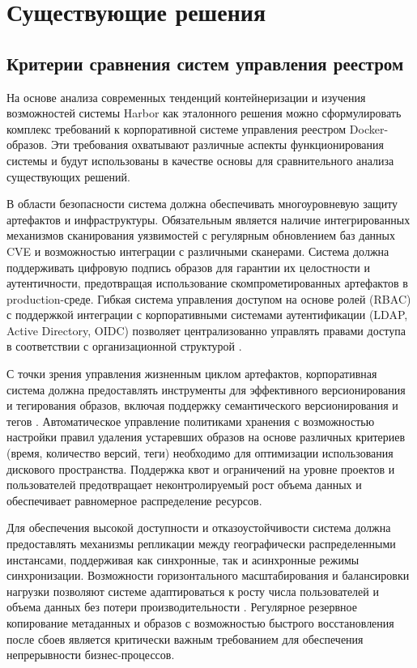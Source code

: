 \chapter{Существующие решения}
\section{Критерии сравнения систем управления реестром}

На основе анализа современных тенденций контейнеризации и изучения возможностей системы Harbor как эталонного решения можно сформулировать комплекс требований к корпоративной системе управления реестром Docker-образов. Эти требования охватывают различные аспекты функционирования системы и будут использованы в качестве основы для сравнительного анализа существующих решений.

В области безопасности система должна обеспечивать многоуровневую защиту артефактов и инфраструктуры. Обязательным является наличие интегрированных механизмов сканирования уязвимостей с регулярным обновлением баз данных CVE и возможностью интеграции с различными сканерами. Система должна поддерживать цифровую подпись образов для гарантии их целостности и аутентичности, предотвращая использование скомпрометированных артефактов в production-среде. Гибкая система управления доступом на основе ролей (RBAC) с поддержкой интеграции с корпоративными системами аутентификации (LDAP, Active Directory, OIDC) позволяет централизованно управлять правами доступа в соответствии с организационной структурой \cite{harbor-docs}.

С точки зрения управления жизненным циклом артефактов, корпоративная система должна предоставлять инструменты для эффективного версионирования и тегирования образов, включая поддержку семантического версионирования и тегов \cite{docker-spec}. Автоматическое управление политиками хранения с возможностью настройки правил удаления устаревших образов на основе различных критериев (время, количество версий, теги) необходимо для оптимизации использования дискового пространства. Поддержка квот и ограничений на уровне проектов и пользователей предотвращает неконтролируемый рост объема данных и обеспечивает равномерное распределение ресурсов.

Для обеспечения высокой доступности и отказоустойчивости система должна предоставлять механизмы репликации между географически распределенными инстансами, поддерживая как синхронные, так и асинхронные режимы синхронизации. Возможности горизонтального масштабирования и балансировки нагрузки позволяют системе адаптироваться к росту числа пользователей и объема данных без потери производительности \cite{gartner2023}. Регулярное резервное копирование метаданных и образов с возможностью быстрого восстановления после сбоев является критически важным требованием для обеспечения непрерывности бизнес-процессов.


